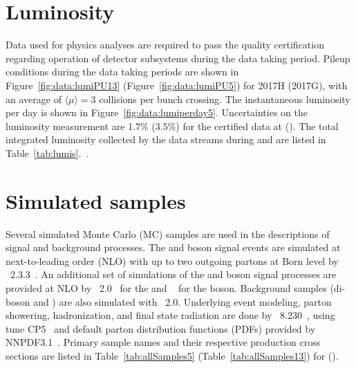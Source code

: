 
\section{Luminosity}\label{ch:lumi}
Data used for physics analyses are required to pass the quality certification regarding operation of detector subsystems during the data taking period. Pileup conditions during the data taking periods are shown in Figure~\ref{fig:data:lumiPU13} (Figure~\ref{fig:data:lumiPU5}) for 2017H (2017G), with an average of $\langle\mu\rangle=3$ collisions per bunch crossing. The instantaneous luminosity per day is shown in Figure~\ref{fig:data:lumiperday5}. Uncertainties on the luminosity measurement are 1.7\% (3.5\%) for the certified data at \sh (\sg). The total integrated luminosity collected by the data streams during \sg and \sh are listed in Table~\ref{tab:lumis}.~\cite{LumiCalibTwiki,CMS:2018elu}.






\section{Simulated samples}\label{ch:data:sim}
Several simulated Monte Carlo (MC) samples are used in the descriptions of signal and background processes. The \Wpm and \Z boson signal events are simulated at next-to-leading order (NLO) with up to two outgoing partons at Born level by \MGvATNLO~2.3.3~\cite{Alwall:2014hca}. An additional set of simulations of the \Wpm and \Z boson signal processes are provided at NLO by \POWHEG~2.0~\cite{Alioli:2008gx,Frixione:2007vw,powheg:2010,Alioli:2010xd} for the \Wpm and \MINLO~\cite{Hamilton:2012rf} for the \Z boson. Background samples (di-boson and \ttbar) are also simulated with \POWHEG~2.0. Underlying event modeling, parton showering, hadronization, and final state radiation are done by \PYTHIA~8.230~\cite{Sjostrand:2014zea}, using tune CP5~\cite{Sirunyan:2019dfx} and default parton distribution functions (PDFs) provided by NNPDF3.1~\cite{Ball:2017nwa}. Primary sample names and their respective production cross sections are listed in Table~\ref{tab:allSamples5} (Table~\ref{tab:allSamples13}) for \sg (\sh).

